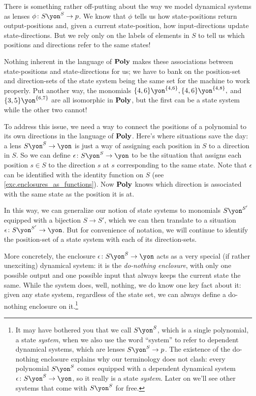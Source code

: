 \documentclass[Book-Poly]{subfiles}
\begin{document}
\begin{example} \label{ex.do_nothing}
There is something rather off-putting about the way we model dynamical systems as lenses $\phi\colon S\yon^S\to p$.
We know that $\phi$ tells us how state-positions return output-positions and, given a current state-position, how input-directions update state-directions.
But we rely only on the labels of elements in $S$ to tell us which positions and directions refer to the same states!

Nothing inherent in the language of $\mathbf{Poly}$ makes these associations between state-positions and state-directions for us; we have to bank on the position-set and direction-sets of the state system being the same set for the machine to work properly.
Put another way, the monomials $\{4,6\}\yon^{\{4,6\}},\{4,6\}\yon^{\{4,8\}},$ and $\{3,5\}\yon^{\{6,7\}}$ are all isomorphic in $\mathbf{Poly}$, but the first can be a state system while the other two cannot!

To address this issue, we need a way to connect the positions of a polynomial to its own directions in the language of $\mathbf{Poly}$.
Here's where situations save the day: a lens $S\yon^S\to\yon$ is just a way of assigning each position in $S$ to a direction in $S$.
So we can define $\epsilon\colon S\yon^S\to\yon$ to be the situation that assigns each position $s\in S$ to the direction $s$ at $s$ corresponding to the same state.
Note that $\epsilon$ can be identified with the identity function on $S$ (see \cref{exc.enclosures_as_functions}).
Now $\mathbf{Poly}$ knows which direction is associated with the same state as the position it is at.

In this way, we can generalize our notion of state systems to monomials $S\yon^{S'}$ equipped with a bijection $S\to S'$, which we can then translate to a situation $\epsilon\colon S\yon^{S'}\to\yon$.
But for convenience of notation, we will continue to identify the position-set of a state system with each of its direction-sets.

More concretely, the enclosure $\epsilon\colon S\yon^S\to\yon$ acts as a very special (if rather unexciting) dynamical system: it is the \emph{do-nothing enclosure}, with only one possible output and one possible input that always keeps the current state the same.
While the system does, well, nothing, we do know one key fact about it: given any state system, regardless of the state set, we can always define a do-nothing enclosure on it.\footnote{It may have bothered you that we call $S\yon^S$, which is a single polynomial, a state \emph{system}, when we also use the word ``system'' to refer to dependent dynamical systems, which are lenses $S\yon^S\to p$.
The existence of the do-nothing enclosure explains why our terminology does not clash: every polynomial $S\yon^S$ comes equipped with a dependent dynamical system $\epsilon\colon S\yon^S\to\yon$, so it really is a state \emph{system}.
Later on we'll see other systems that come with $S\yon^S$ for free.}


\end{example}
\end{document}
